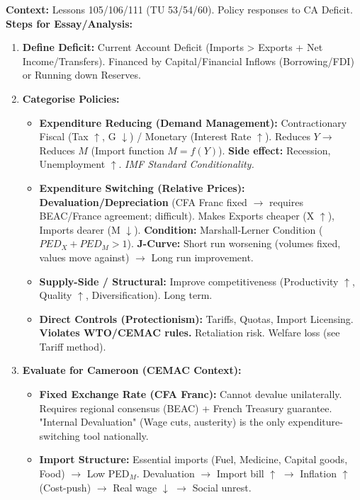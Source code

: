 \documentclass[11pt]{article}
\begin{document}
\begin{methode}
\textbf{Context:} Lessons 105/106/111 (TU 53/54/60). Policy responses to CA Deficit.
\textbf{Steps for Essay/Analysis:}
\begin{enumerate}
    \item \textbf{Define Deficit:} Current Account Deficit (Imports > Exports + Net Income/Transfers). Financed by Capital/Financial Inflows (Borrowing/FDI) or Running down Reserves.
    \item \textbf{Categorise Policies:}
        \begin{itemize}
            \item \textbf{Expenditure Reducing (Demand Management):} Contractionary Fiscal (Tax $\uparrow$, G $\downarrow$) / Monetary (Interest Rate $\uparrow$). Reduces $Y \rightarrow$ Reduces $M$ (Import function $M = f(Y)$). \textbf{Side effect:} Recession, Unemployment $\uparrow$. \textit{IMF Standard Conditionality.}
            \item \textbf{Expenditure Switching (Relative Prices):} \textbf{Devaluation/Depreciation} (CFA Franc fixed $\rightarrow$ requires BEAC/France agreement; difficult). Makes Exports cheaper (X $\uparrow$), Imports dearer (M $\downarrow$). \textbf{Condition:} Marshall-Lerner Condition ($PED_X + PED_M > 1$). \textbf{J-Curve:} Short run worsening (volumes fixed, values move against) $\rightarrow$ Long run improvement.
            \item \textbf{Supply-Side / Structural:} Improve competitiveness (Productivity $\uparrow$, Quality $\uparrow$, Diversification). Long term.
            \item \textbf{Direct Controls (Protectionism):} Tariffs, Quotas, Import Licensing. \textbf{Violates WTO/CEMAC rules.} Retaliation risk. Welfare loss (see Tariff method).
        \end{itemize}
    \item \textbf{Evaluate for Cameroon (CEMAC Context):}
        \begin{itemize}
            \item \textbf{Fixed Exchange Rate (CFA Franc):} Cannot devalue unilaterally. Requires regional consensus (BEAC) + French Treasury guarantee. "Internal Devaluation" (Wage cuts, austerity) is the only expenditure-switching tool nationally.
            \item \textbf{Import Structure:} Essential imports (Fuel, Medicine, Capital goods, Food) $\rightarrow$ Low PED$_M$. Devaluation $\rightarrow$ Import bill $\uparrow$ $\rightarrow$ Inflation $\uparrow$ (Cost-push) $\rightarrow$ Real wage $\downarrow$ $\rightarrow$ Social unrest.

\end{itemize}
\end{enumerate}
\end{methode}
\end{document}
